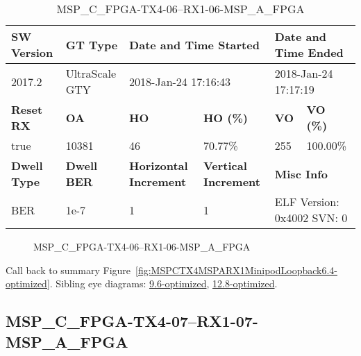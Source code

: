 \begin{table}[h]
\centering
\caption{MSP\_C\_FPGA-TX4-06--RX1-06-MSP\_A\_FPGA}
\label{tab:MSPCFPGATX406RX106MSPAFPGA6.4-optimized}
\begin{tabular}{@{}|l|l|l|l|l|l|@{}}
\toprule
\textbf{SW Version}                & \textbf{GT Type}   & \multicolumn{2}{l|}{\textbf{Date and Time Started}}            & \multicolumn{2}{l|}{\textbf{Date and Time Ended}}        \\ \midrule
2017.2                       & UltraScale GTY          & \multicolumn{2}{l|}{2018-Jan-24 17:16:43}                   & \multicolumn{2}{l|}{2018-Jan-24 17:17:19}               \\ \midrule
\textbf{Reset RX}                  & \textbf{OA} & \textbf{HO}   & \textbf{HO (\%)} & \textbf{VO} & \textbf{VO (\%)} \\ \midrule
true & 10381        & 46          & 70.77\%        & 255        & 100.00\%       \\ \midrule
\textbf{Dwell Type}                & \textbf{Dwell BER} & \textbf{Horizontal Increment} & \textbf{Vertical Increment}    & \multicolumn{2}{l|}{\textbf{Misc Info}}                  \\ \midrule
BER                            & 1e-7        & 1        & 1           & \multicolumn{2}{l|}{ELF Version: 0x4002 SVN: 0}                         \\ \bottomrule
\end{tabular}
\end{table}

\begin{figure}[h]
\caption{MSP\_C\_FPGA-TX4-06--RX1-06-MSP\_A\_FPGA} \label{fig:MSPCFPGATX406RX106MSPAFPGA6.4-optimized}
\end{figure}

Call back to summary Figure~\ref{fig:MSPCTX4MSPARX1MinipodLoopback6.4-optimized}.
Sibling eye diagrams: \hyperref[sec:MSPCFPGATX406RX106MSPAFPGA9.6-optimized]{9.6-optimized}, \hyperref[sec:MSPCFPGATX406RX106MSPAFPGA12.8-optimized]{12.8-optimized}.

\clearpage
\newpage


\subsection{MSP\_C\_FPGA-TX4-07--RX1-07-MSP\_A\_FPGA}\label{sec:MSPCFPGATX407RX107MSPAFPGA6.4-optimized}

